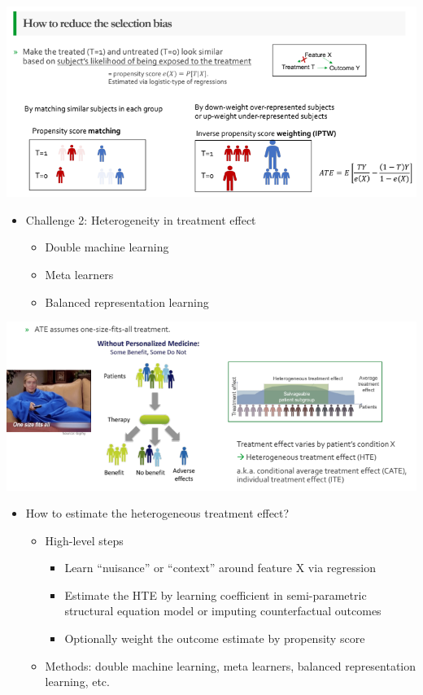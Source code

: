 \documentclass[
]{book}
\providecommand{\tightlist}{%
  \setlength{\itemsep}{0pt}\setlength{\parskip}{0pt}}
\theoremstyle{definition}
\theoremstyle{definition}
\theoremstyle{definition}
\theoremstyle{definition}
\theoremstyle{remark}
\begin{document}
\includegraphics{figures/10.png}

\begin{itemize}
\tightlist
\item
  Challenge 2: Heterogeneity in treatment effect

  \begin{itemize}
  \tightlist
  \item
    Double machine learning
  \item
    Meta learners
  \item
    Balanced representation learning
  \end{itemize}
\end{itemize}

\includegraphics{figures/11.png}

\begin{itemize}
\tightlist
\item
  How to estimate the heterogeneous treatment effect?

  \begin{itemize}
  \tightlist
  \item
    High-level steps

    \begin{itemize}
    \tightlist
    \item
      Learn ``nuisance'' or ``context'' around feature X via regression
    \item
      Estimate the HTE by learning coefficient in semi-parametric structural equation model or imputing counterfactual outcomes
    \item
      Optionally weight the outcome estimate by propensity score
    \end{itemize}
  \item
    Methods: double machine learning, meta learners, balanced representation learning, etc.
  \end{itemize}
\end{itemize}
\end{document}
